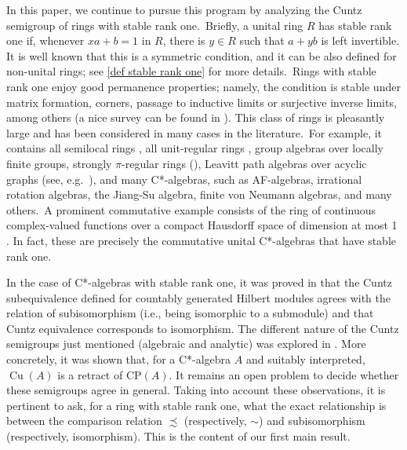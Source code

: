 \documentclass[11pt]{amsart}
\numberwithin{equation}{section}
\theoremstyle{definition}
\DeclareMathOperator{\Cu}{Cu}
\newcommand{\CP}{\mathrm{CP}}
\theoremstyle{plain}
\theoremstyle{definition}
\begin{document}
In this paper, we continue to pursue this program by analyzing the Cuntz semigroup of rings with stable rank one.~Briefly, a unital ring $R$ has stable rank one if, whenever $xa+b=1$ in $R$, there is $y\in R$ such that $a+yb$ is left invertible. It is well known that this is a symmetric condition, and it can be also defined for non-unital rings; see \autoref{def stable rank one} for more details.~Rings with stable rank one enjoy good permanence properties; namely, the condition is stable under matrix formation, corners, passage to inductive limits or surjective inverse limits, among others (a nice survey can be found in \cite{Vaserstein84StRangeCond}). This class of rings is pleasantly large and has been considered in many cases in the literature.~For example, it contains all semilocal rings \cite[Theorem 4.4]{facchini98}, all unit-regular rings \cite[Proposition 4.12]{goodearlvnrr}, group algebras over locally finite groups, strongly $\pi$-regular rings (\cite{Ara96Strongly}), Leavitt path algebras over acyclic graphs (see, e.g.~\cite[4.4]{AbrAraSil17Leavitt}), and many C*-algebras, such as AF-algebras, irrational rotation algebras, the Jiang-Su algebra, finite von Neumann algebras, and many others.~A prominent commutative example consists of the ring of continuous complex-valued functions over a compact Hausdorff space of dimension at most 1 \cite{vaserstein1971}. In fact, these are precisely the commutative unital C*-algebras that have stable rank one.

In the case of C*-algebras with stable rank one, it was proved in \cite{CowEllIva08CuInv} that the Cuntz subequivalence defined for countably generated Hilbert modules agrees with the relation of subisomorphism (i.e., being isomorphic to a submodule) and that Cuntz equivalence corresponds to isomorphism. The different nature of the Cuntz semigroups just mentioned (algebraic and analytic) was explored in \cite[Section 7]{AntAraBosPerVil25}. More concretely, it was shown that, for a C*-algebra $A$ and suitably interpreted, $\Cu(A)$ is a retract of $\CP(A)$. It remains an open problem to decide whether these semigroups agree in general. Taking into account these observations, it is pertinent to ask, for a ring with stable rank one, what the exact relationship is between the comparison relation $\precsim$ (respectively, $\sim$) and subisomorphism (respectively, isomorphism). This is the content of our first main result.
\end{document}
